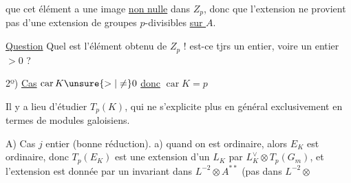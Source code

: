 que cet élément a une image \uline{non nulle} dans $Z_p$, donc que l'extension ne provient pas d'une extension de groupes $p$-divisibles \uline{sur $A$}.

\uline{Question} Quel est l'élément obtenu de $Z_p$ ! est-ce tjrs un entier, voire un entier $>0$ ?

2º) \uline{Cas} $\operatorname{car}K\unsure{>|\ne}0$ \uline{donc} $\operatorname{car}K=p$

 Il y a lieu d'étudier $T_p(K)$, qui ne s'explicite plus en général exclusivement en termes de modules galoisiens.

A) Cas $j$ entier (bonne réduction). a)  quand on est ordinaire, alors $E_K$ est ordinaire, donc
$T_p(E_K)$ est une extension d'un $L_K$ par $L_K^{\vee}\otimes T_p(G_m)$, et l'extension est donnée par un invariant dans $L^{-2}\otimes A^{**}$ (pas  dans $L^{-2}\otimes$
